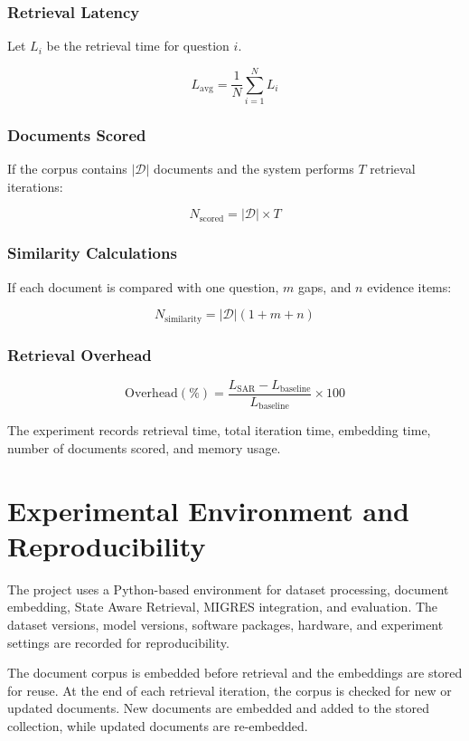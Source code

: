 \documentclass[12pt,a4paper]{report}
\begin{document}
\subsubsection{Retrieval Latency}

Let $L_i$ be the retrieval time for question $i$.

\[
L_{\mathrm{avg}}
=
\frac{1}{N}
\sum_{i=1}^{N}L_i
\]

\subsubsection{Documents Scored}

If the corpus contains $|\mathcal{D}|$ documents and the system performs
$T$ retrieval iterations:

\[
N_{\mathrm{scored}}
=
|\mathcal{D}|\times T
\]

\subsubsection{Similarity Calculations}

If each document is compared with one question, $m$ gaps, and $n$
evidence items:

\[
N_{\mathrm{similarity}}
=
|\mathcal{D}|(1+m+n)
\]

\subsubsection{Retrieval Overhead}

\[
\mathrm{Overhead(\%)}
=
\frac{
L_{\mathrm{SAR}}-L_{\mathrm{baseline}}
}
{
L_{\mathrm{baseline}}
}
\times100
\]

The experiment records retrieval time, total iteration time, embedding
time, number of documents scored, and memory usage.
\clearpage
\section{Experimental Environment and Reproducibility}

The project uses a Python-based environment for dataset processing,
document embedding, State Aware Retrieval, MIGRES integration, and
evaluation. The dataset versions, model versions, software packages,
hardware, and experiment settings are recorded for reproducibility.

The document corpus is embedded before retrieval and the embeddings are
stored for reuse. At the end of each retrieval iteration, the corpus is
checked for new or updated documents. New documents are embedded and
added to the stored collection, while updated documents are re-embedded.
\end{document}
